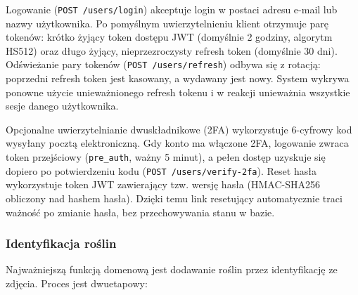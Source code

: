\documentclass[12pt,a4paper]{article}
\begin{document}
Logowanie (\texttt{POST /users/login}) akceptuje login w postaci adresu e-mail lub nazwy u\.zytkownika. Po pomy\'slnym uwierzytelnieniu klient otrzymuje par\k{e} token\'ow: kr\'otko \.zyj\k{a}cy token dost\k{e}pu JWT (domy\'slnie 2 godziny, algorytm HS512) oraz d\l{}ugo \.zyj\k{a}cy, nieprzezroczysty refresh token (domy\'slnie 30 dni). Od\'swie\.zanie pary token\'ow (\texttt{POST /users/refresh}) odbywa si\k{e} z rotacj\k{a}: poprzedni refresh token jest kasowany, a wydawany jest nowy. System wykrywa ponowne u\.zycie uniewa\.znionego refresh tokenu i w reakcji uniewa\.znia wszystkie sesje danego u\.zytkownika.

Opcjonalne uwierzytelnianie dwusk\l{}adnikowe (2FA) wykorzystuje 6-cyfrowy kod wysy\l{}any poczt\k{a} elektroniczn\k{a}. Gdy konto ma w\l{}\k{a}czone 2FA, logowanie zwraca token przej\'sciowy (\texttt{pre\_auth}, wa\.zny 5 minut), a pe\l{}en dost\k{e}p uzyskuje si\k{e} dopiero po potwierdzeniu kodu (\texttt{POST /users/verify-2fa}). Reset has\l{}a wykorzystuje token JWT zawieraj\k{a}cy tzw. wersj\k{e} has\l{}a (HMAC-SHA256 obliczony nad hashem has\l{}a). Dzi\k{e}ki temu link resetuj\k{a}cy automatycznie traci wa\.zno\'s\'c po zmianie has\l{}a, bez przechowywania stanu w bazie.

\subsubsection{Identyfikacja ro\'slin}

Najwa\.zniejsz\k{a} funkcj\k{a} domenow\k{a} jest dodawanie ro\'slin przez identyfikacj\k{e} ze zdj\k{e}cia. Proces jest dwuetapowy:
\end{document}
